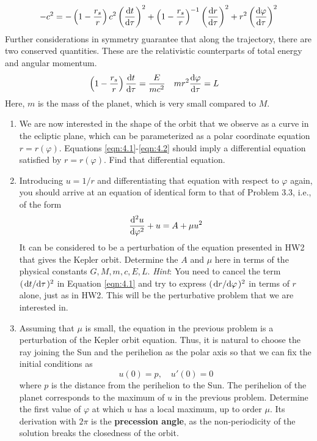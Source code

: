 \documentclass[../psets.tex]{subfiles}
\begin{document}
\begin{equation}\label{eqn:4.1}
    -c^2 = -\left( 1-\frac{r_s}{r} \right)c^2\left( \dv{t}{\tau} \right)^2+\left( 1-\frac{r_s}{r} \right)^{-1}\left( \dv{r}{\tau} \right)^2+r^2\left( \dv{\varphi}{\tau} \right)^2
\end{equation}
Further considerations in symmetry guarantee that along the trajectory, there are two conserved quantities. These are the relativistic counterparts of total energy and angular momentum.
\begin{align}\label{eqn:4.2}
    \left( 1-\frac{r_s}{r} \right)\dv{t}{\tau} &= \frac{E}{mc^2}&
    mr^2\dv{\varphi}{\tau} &= L
\end{align}
Here, $m$ is the mass of the planet, which is very small compared to $M$.
\begin{enumerate}
    \item We are now interested in the shape of the orbit that we observe as a curve in the ecliptic plane, which can be parameterized as a polar coordinate equation $r=r(\varphi)$. Equations \ref{eqn:4.1}-\ref{eqn:4.2} should imply a differential equation satisfied by $r=r(\varphi)$. Find that differential equation.
    \item Introducing $u=1/r$ and differentiating that equation with respect to $\varphi$ again, you should arrive at an equation of identical form to that of Problem 3.3, i.e., of the form
    \begin{equation*}
        \dv[2]{u}{\varphi}+u = A+\mu u^2
    \end{equation*}
    It can be considered to be a perturbation of the equation presented in HW2 that gives the Kepler orbit. Determine the $A$ and $\mu$ here in terms of the physical constants $G,M,m,c,E,L$. \emph{Hint}: You need to cancel the term $(\dv*{t}{\tau})^2$ in Equation \ref{eqn:4.1} and try to express $(\dv*{r}{\varphi})^2$ in terms of $r$ alone, just as in HW2. This will be the perturbative problem that we are interested in.
    \item Assuming that $\mu$ is small, the equation in the previous problem is a perturbation of the Kepler orbit equation. Thus, it is natural to choose the ray joining the Sun and the perihelion as the polar axis so that we can fix the initial conditions as
    \begin{equation*}
        u(0) = p
        ,\quad
        u'(0) = 0
    \end{equation*}
    where $p$ is the distance from the perihelion to the Sun. The perihelion of the planet corresponds to the maximum of $u$ in the previous problem. Determine the first value of $\varphi$ at which $u$ has a local maximum, up to order $\mu$. Its derivation with $2\pi$ is the \textbf{precession angle}, as the non-periodicity of the solution breaks the closedness of the orbit.\par

\end{enumerate}
\end{document}
